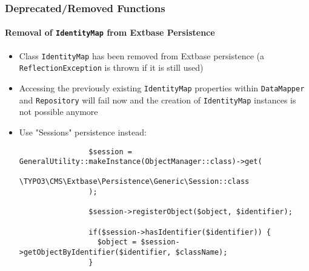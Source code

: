\begin{frame}[fragile]
	\frametitle{Deprecated/Removed Functions}
	\framesubtitle{Removal of \texttt{IdentityMap} from Extbase Persistence}

	\lstset{basicstyle=\tiny\ttfamily}

	\begin{itemize}

		\item Class \texttt{IdentityMap} has been removed from Extbase persistence\newline
			\small(a \texttt{ReflectionException} is thrown if it is still used)\normalsize

		\item Accessing the previously existing \texttt{IdentityMap} properties within
			\texttt{DataMapper} and \texttt{Repository} will fail now and the creation of
			\texttt{IdentityMap} instances is not possible anymore

		\item Use "Sessions" persistence instead:

			\begin{lstlisting}
				$session = GeneralUtility::makeInstance(ObjectManager::class)->get(
				  \TYPO3\CMS\Extbase\Persistence\Generic\Session::class
				);

				$session->registerObject($object, $identifier);

				if($session->hasIdentifier($identifier)) {
				  $object = $session->getObjectByIdentifier($identifier, $className);
				}
			\end{lstlisting}

	\end{itemize}

\end{frame}


